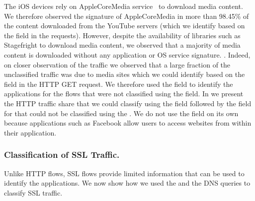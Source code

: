 The iOS devices rely on AppleCoreMedia service~\cite{apple:coremedia} to download media content.
We therefore observed the signature of AppleCoreMedia in more than 98.45\% of the content downloaded from the YouTube servers (which we identify based on the \httphost field in the \httpget requests). 
However, despite the availability of libraries such as Stagefright\cite{android:stagefright} to download media content, we observed that a majority of media content is downloaded without any application or OS service signature.
.
Indeed, on closer observation of the traffic we observed that a large fraction of the unclassified traffic was due to media sites which we could identify based on the \httphost field in the HTTP GET request. 
We therefore used the \httphost field to identify the applications for the flows that were not classified using the \useragent field. 
In  we present the HTTP traffic share that we could classify using the \useragent field followed by the \httphost field for that could not be classified using the \useragent.
We do not use the \httphost field on its own because applications such as Facebook allow users to access websites from within their application. 

\subsubsection{Classification of SSL Traffic.}

Unlike HTTP flows, SSL flows provide limited information that can be used to identify the applications. 
We now show how we used the \sslservername and the DNS queries to classify SSL traffic. 

